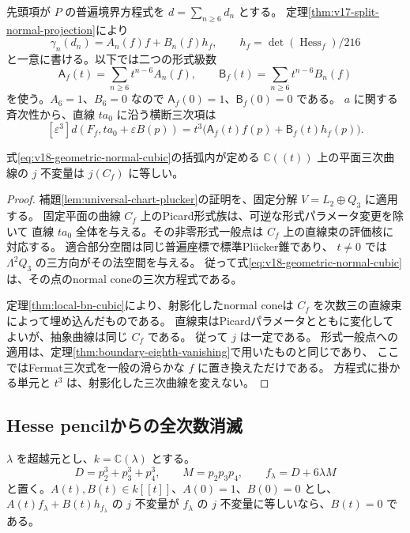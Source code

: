 先頭項が $P$ の普遍境界方程式を $d=\sum_{n\ge6}d_n$ とする。
定理\ref{thm:v17-split-normal-projection}により
\[
 \gamma_n(d_n)=A_n(f)f+B_n(f)h_f,
 \qquad h_f=\det(\operatorname{Hess}_f)/216
\]
と一意に書ける。以下では二つの形式級数
\begin{equation}\label{eq:v18-normal-pencil-series}
 \mathsf A_f(t)=\sum_{n\ge6}t^{n-6}A_n(f),\qquad
 \mathsf B_f(t)=\sum_{n\ge6}t^{n-6}B_n(f)
\end{equation}
を使う。$A_6=1$、$B_6=0$ なので
$\mathsf A_f(0)=1$、$\mathsf B_f(0)=0$ である。
$a$ に関する斉次性から、直線 $t a_0$ に沿う横断三次項は
\begin{equation}\label{eq:v18-geometric-normal-cubic}
 [\varepsilon^3]d(F_f,t a_0+\varepsilon B(p))
 =t^3\bigl(\mathsf A_f(t)f(p)+\mathsf B_f(t)h_f(p)\bigr).
\end{equation}

\begin{lemma}[横断三次曲線の抽象同型類]
\label{lem:v18-fixed-plane-normal-j}
式\eqref{eq:v18-geometric-normal-cubic}の括弧内が定める
$\mathbb C((t))$ 上の平面三次曲線の $j$ 不変量は $j(C_f)$ に等しい。
\end{lemma}

\begin{proof}
補題\ref{lem:universal-chart-plucker}の証明を、固定分解
$V=L_2\oplus Q_3$ に適用する。
固定平面の曲線 $C_f$ 上のPicard形式族は、可逆な形式パラメータ変更を除いて
直線 $t a_0$ 全体を与える。その非零形式一般点は $C_f$ 上の直線束の評価核に対応する。
適合部分空間は同じ普遍座標で標準Pl\"ucker錐であり、
$t\ne0$ では $\Lambda^2Q_3$ の三方向がその法空間を与える。
従って式\eqref{eq:v18-geometric-normal-cubic}は、その点のnormal coneの三次方程式である。

定理\ref{thm:local-bn-cubic}により、射影化したnormal coneは
$C_f$ を次数三の直線束によって埋め込んだものである。
直線束はPicardパラメータとともに変化してよいが、抽象曲線は同じ $C_f$ である。
従って $j$ は一定である。
形式一般点への適用は、定理\ref{thm:boundary-eighth-vanishing}で用いたものと同じであり、
ここではFermat三次式を一般の滑らかな $f$ に置き換えただけである。
方程式に掛かる単元と $t^3$ は、射影化した三次曲線を変えない。
\end{proof}

\subsection{Hesse pencilからの全次数消滅}

\begin{lemma}
\label{lem:v18-hesse-formal-rigidity}
$\lambda$ を超越元とし、$k=\mathbb C(\lambda)$ とする。
\[
 D=p_2^3+p_3^3+p_4^3,\qquad M=p_2p_3p_4,\qquad
 f_\lambda=D+6\lambda M
\]
と置く。$A(t),B(t)\in k[[t]]$、$A(0)=1$、$B(0)=0$ とし、
$A(t)f_\lambda+B(t)h_{f_\lambda}$ の $j$ 不変量が
$f_\lambda$ の $j$ 不変量に等しいなら、$B(t)=0$ である。
\end{lemma}

